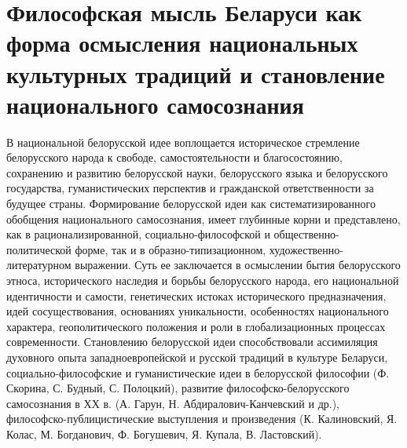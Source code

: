 \section{Философская мысль Беларуси как форма осмысления национальных культурных традиций и становление национального самосознания}
\label{sec:analysis}

В национальной белорусской идее воплощается историческое стремление белорусского народа к свободе, самостоятельности и благосостоянию, сохранению и развитию белорусской науки, белорусского языка и белорусского государства, гуманистических перспектив и гражданской ответственности за будущее страны.
Формирование белорусской идеи как систематизированного обобщения национального самосознания, имеет глубинные корни и представлено, как в рационализированной, социально-философской и общественно-политической форме, так и в образно-типизационном, художественно-литературном выражении. Суть ее заключается в осмыслении бытия белорусского этноса, исторического наследия и борьбы белорусского народа, его национальной идентичности и самости, генетических истоках исторического предназначения, идей сосуществования, основаниях уникальности, особенностях национального характера, геополитического положения и роли в глобализационных процессах современности. Становлению белорусской идеи способствовали ассимиляция духовного опыта западноевропейской и русской традиций в культуре Беларуси, социально-философские и гуманистические идеи в белорусской философии (Ф. Скорина, С. Будный, С. Полоцкий), развитие философско-белорусского самосознания в ХХ в. (А. Гарун, Н. Абдиралович-Канчевский и др.), философско-публицистические выступления и произведения (К. Калиновский, Я. Колас, М. Богданович, Ф. Богушевич, Я. Купала, В. Ластовский).


